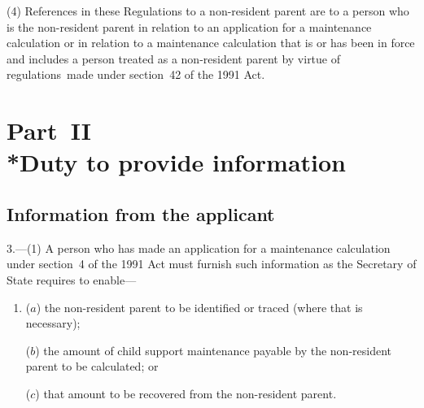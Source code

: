 \documentclass[12pt,a4paper]{article}
\begin{document}
%
%

(4) References in these Regulations to a non-resident parent are to a person who is the non-resident parent in relation to an application for a maintenance calculation or in relation to a maintenance calculation that is or has been in force and includes a person treated as a non-resident parent by virtue of regulations~made under section~42 of the 1991 Act.


\section[Part~II --- Duty to provide information]{Part~II\\*Duty to provide information}

\renewcommand\parthead{--- Part~II}

\subsection[3. Information from the applicant]{Information from the applicant}

3.---(1)  A person who has made an application for a maintenance calculation under section~4 of the 1991 Act must furnish such information as the 
Secretary of State  %
requires to enable—
\begin{enumerate}\item[]
($a$) the non-resident parent to be identified or traced (where that is necessary);

($b$) the amount of child support maintenance payable by the non-resident parent to be calculated; or

($c$) that amount to be recovered from the non-resident parent.
\end{enumerate}
\end{document}
